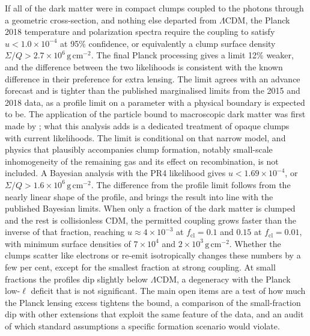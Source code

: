 \documentclass[11pt,a4paper]{article}
\newcommand{\cl}{\mathrm{cl}}
\begin{document}
If all of the dark matter were in compact clumps coupled to the photons through a geometric cross-section, and nothing else departed from $\Lambda$CDM, the Planck 2018 temperature and polarization spectra require the coupling to satisfy $u < 1.0\times10^{-4}$ at 95\% confidence, or equivalently a clump surface density $\Sigma/Q > 2.7\times10^{6}\,\mathrm{g\,cm^{-2}}$. The final Planck processing gives a limit 12\% weaker, and the difference between the two likelihoods is consistent with the known difference in their preference for extra lensing. The limit agrees with an advance forecast and is tighter than the published marginalised limits from the 2015 and 2018 data, as a profile limit on a parameter with a physical boundary is expected to be. The application of the particle bound to macroscopic dark matter was first made by \citet{Jacobs2015}; what this analysis adds is a dedicated treatment of opaque clumps with current likelihoods. The limit is conditional on that narrow model, and physics that plausibly accompanies clump formation, notably small-scale inhomogeneity of the remaining gas and its effect on recombination, is not included. A Bayesian analysis with the PR4 likelihood gives $u < 1.69\times10^{-4}$, or $\Sigma/Q > 1.6\times10^{6}\,\mathrm{g\,cm^{-2}}$. The difference from the profile limit follows from the nearly linear shape of the profile, and brings the result into line with the published Bayesian limits. When only a fraction of the dark matter is clumped and the rest is collisionless CDM, the permitted coupling grows faster than the inverse of that fraction, reaching $u \approx 4\times10^{-3}$ at $f_\cl = 0.1$ and $0.15$ at $f_\cl = 0.01$, with minimum surface densities of $7\times10^{4}$ and $2\times10^{3}\,\mathrm{g\,cm^{-2}}$. Whether the clumps scatter like electrons or re-emit isotropically changes these numbers by a few per cent, except for the smallest fraction at strong coupling. At small fractions the profiles dip slightly below $\Lambda$CDM, a degeneracy with the Planck low-$\ell$ deficit that is not significant. The main open items are a test of how much the Planck lensing excess tightens the bound, a comparison of the small-fraction dip with other extensions that exploit the same feature of the data, and an audit of which standard assumptions a specific formation scenario would violate.
\end{document}

